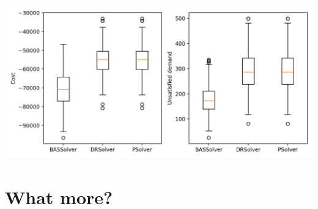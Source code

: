 \documentclass{beamer}
\begin{document}
\begin{frame}[allowframebreaks]
	\framebreak
	\includegraphics[width=\textwidth]{../figure/benchmark.png}
\end{frame}

\section{What more?} %
\begin{frame}
\end{frame}
\end{document}
